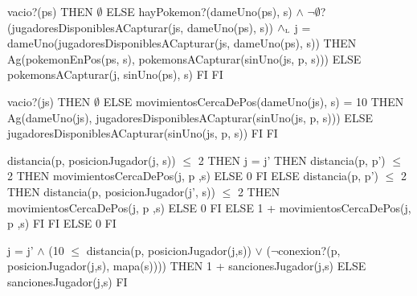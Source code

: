 \begin{tad}{}



		{\IF vacio?(ps) THEN
			$\emptyset$
		ELSE
			{\IF hayPokemon?(dameUno(ps), s) $\land$ $\neg\emptyset$?(jugadoresDisponiblesACapturar(js, dameUno(ps), s)) $\land_{\mathrm{\scriptscriptstyle{L}}}$ j = dameUno(jugadoresDisponiblesACapturar(js, dameUno(ps), s)) THEN
				Ag(pokemonEnPos(ps, s), pokemonsACapturar(sinUno(js, p, s)))
			ELSE
				pokemonsACapturar(j, sinUno(ps), s)
			FI}			
		FI}

		{\IF vacio?(js) THEN
			$\emptyset$
		ELSE
			{\IF movimientosCercaDePos(dameUno(js), s) = 10 THEN
				Ag(dameUno(js), jugadoresDisponiblesACapturar(sinUno(js, p, s)))
			ELSE
				jugadoresDisponiblesACapturar(sinUno(js, p, s))
			FI}
		FI}


		{\IF distancia(p, posicionJugador(j, s)) $\leq$ 2 THEN
			{\IF j = j' THEN
				{\IF distancia(p, p') $\leq$ 2 THEN
					movimientosCercaDePos(j, p ,s)
				ELSE
					0
				FI}
			ELSE
				{\IF distancia(p, p') $\leq$ 2 THEN
					{\IF distancia(p, posicionJugador(j', s)) $\leq$ 2 THEN
						movimientosCercaDePos(j, p ,s)
					ELSE
						0
					FI}
				ELSE
					1 + movimientosCercaDePos(j, p ,s)
				FI}
			FI}
		ELSE
			0
		FI}






		{\IF j = j' $\land$ (10 $\leq$ distancia(p, posicionJugador(j,s)) $\lor$ ($\neg$conexion?(p, posicionJugador(j,s), mapa(s)))) THEN 
			1 +	sancionesJugador(j,s)
		ELSE sancionesJugador(j,s) FI}


\end{tad}
